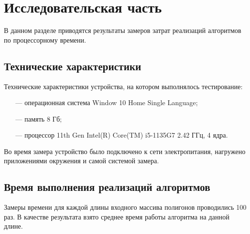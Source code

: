 \chapter{Исследовательская часть}

В данном разделе приводятся результаты замеров затрат реализаций алгоритмов по процессорному времени.

\section{Технические характеристики}

Технические характеристики устройства, на котором выполнялось тестирование:

\begin{itemize}
	\item[---] операционная система Window 10 Home Single Language;
	\item[---] память 8 Гб;
	\item[---] процессор 11th Gen Intel(R) Core(TM) i5-1135G7 2.42 ГГц, 4 ядра.
\end{itemize}

Во время замера устройство было подключено к сети электропитания, нагружено приложениями окружения и самой системой замера.

\section{Время выполнения реализаций алгоритмов}

Замеры времени для каждой длины входного массива полигонов проводились 100 раз. В качестве результата взято среднее время работы алгоритма на данной длине.

